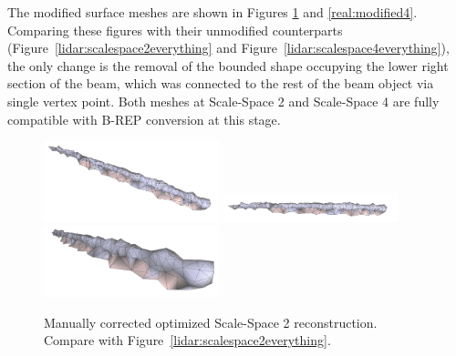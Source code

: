 \documentclass[12pt]{drexelthesis}
\begin{document}

The modified surface meshes are shown in Figures \ref{real:modified2} and \ref{real:modified4}. Comparing these figures with their unmodified counterparts (Figure~\ref{lidar:scalespace2everything} and Figure~\ref{lidar:scalespace4everything}), the only change is the removal of the bounded shape occupying the lower right section of the beam, which was connected to the rest of the beam object via single vertex point. Both meshes at Scale-Space 2 and Scale-Space 4 are fully compatible with B-REP conversion at this stage.

\begin{figure}[!ht]
	\centering
		\includegraphics[width=2in]{real-lab-scans/modmesh/scaleSpace2Modified00.png}
		\includegraphics[width=2in]{real-lab-scans/modmesh/scaleSpace2Modified01.png}
		\includegraphics[width=2in]{real-lab-scans/modmesh/scaleSpace2Modified02.png}
	\caption[Modified optimized surface mesh at Scale-Space 2.]{\centering Manually corrected optimized Scale-Space 2 reconstruction. Compare with Figure~\ref{lidar:scalespace2everything}.}
	\label{real:modified2}
\end{figure}
\end{document}
